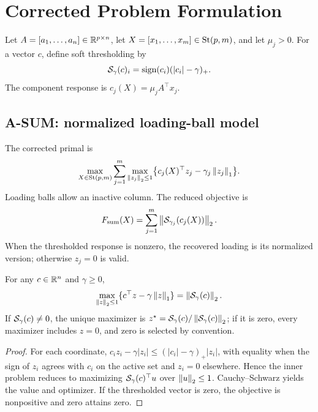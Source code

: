 \section{Corrected Problem Formulation}
\label{sec:setup}
Let \(A=[a_1,\ldots,a_n]\in\mathbb{R}^{p\times n}\), let \(X=[x_1,\ldots,x_m]\in\mathrm{St}(p,m)\), and let \(\mu_j>0\). For a vector \(c\), define soft thresholding by
\[
\mathcal{S}_\gamma(c)_i=\operatorname{sign}(c_i)(|c_i|-\gamma)_+.
\]
The component response is \(c_j(X)=\mu_jA^\top x_j\).

\subsection{A-SUM: normalized loading-ball model}
The corrected primal is
\begin{equation}
\max_{X\in\mathrm{St}(p,m)}\sum_{j=1}^m
\max_{\left\lVert z_j \right\rVert_2\le 1}
\bigl\{c_j(X)^\top z_j-\gamma_j\left\lVert z_j \right\rVert_1\bigr\}.
\label{eq:asum-primal}
\end{equation}
Loading balls allow an inactive column. The reduced objective is
\begin{equation}
F_{\mathrm{sum}}(X)=\sum_{j=1}^m\left\lVert \mathcal{S}_{\gamma_j}(c_j(X)) \right\rVert_2.
\label{eq:asum}
\end{equation}
When the thresholded response is nonzero, the recovered loading is its normalized version; otherwise \(z_j=0\) is valid.

\begin{proposition}
\label{prop:sum-elimination}
For any \(c\in\mathbb{R}^n\) and \(\gamma\ge0\),
\[
\max_{\left\lVert z \right\rVert_2\le1}\{c^\top z-\gamma\left\lVert z \right\rVert_1\}
=\left\lVert \mathcal{S}_\gamma(c) \right\rVert_2.
\]
If \(\mathcal{S}_\gamma(c)\neq0\), the unique maximizer is \(z^\star=\mathcal{S}_\gamma(c)/\left\lVert \mathcal{S}_\gamma(c) \right\rVert_2\); if it is zero, every maximizer includes \(z=0\), and zero is selected by convention.
\end{proposition}
\begin{proof}
For each coordinate, \(c_i z_i-\gamma|z_i|\le (|c_i|-\gamma)_+|z_i|\), with equality when the sign of \(z_i\) agrees with \(c_i\) on the active set and \(z_i=0\) elsewhere. Hence the inner problem reduces to maximizing \(\mathcal{S}_\gamma(c)^\top u\) over \(\left\lVert u \right\rVert_2\le1\). Cauchy--Schwarz yields the value and optimizer. If the thresholded vector is zero, the objective is nonpositive and zero attains zero.
\end{proof}

